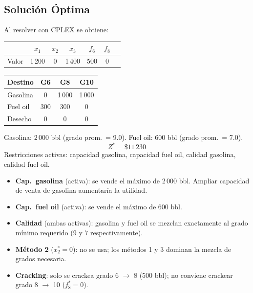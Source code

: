 \documentclass[12pt,a4paper]{article}
\begin{document}
\subsection{Solución Óptima}

Al resolver con CPLEX se obtiene:

\begin{center}
\renewcommand{\arraystretch}{1.3}
\begin{tabular}{@{}lcccccc@{}}
\toprule
& $x_1$ & $x_2$ & $x_3$ & $f_6$ & $f_8$ &\\
\midrule
Valor & 1\,200 & 0 & 1\,400 & 500 & 0 &\\
\bottomrule
\end{tabular}
\end{center}

\begin{center}
\renewcommand{\arraystretch}{1.3}
\begin{tabular}{@{}lccc@{}}
\toprule
\textbf{Destino} & \textbf{G6} & \textbf{G8} & \textbf{G10}\\
\midrule
Gasolina  & 0     & 1\,000 & 1\,000\\
Fuel oil  & 300   & 300    & 0\\
Desecho   & 0     & 0      & 0\\
\bottomrule
\end{tabular}
\end{center}

\begin{solucbox}
Gasolina: 2\,000 bbl (grado prom.\ = 9.0). Fuel oil: 600 bbl (grado prom.\ = 7.0).
\[
  \boxed{Z^* = \$11\,230}
\]
Restricciones activas: capacidad gasolina, capacidad fuel oil, calidad gasolina, calidad fuel oil.
\end{solucbox}

\begin{sensbox}
\begin{itemize}[leftmargin=1.5em]
  \item \textbf{Cap.\ gasolina} (activa): se vende el máximo de 2\,000 bbl.
    Ampliar capacidad de venta de gasolina aumentaría la utilidad.
  \item \textbf{Cap.\ fuel oil} (activa): se vende el máximo de 600 bbl.
  \item \textbf{Calidad} (ambas activas): gasolina y fuel oil se mezclan exactamente
    al grado mínimo requerido (9 y 7 respectivamente).
  \item \textbf{Método 2} ($x_2^*=0$): no se usa; los métodos 1 y 3 dominan
    la mezcla de grados necesaria.
  \item \textbf{Cracking}: solo se crackea grado 6 $\to$ 8 (500 bbl);
    no conviene crackear grado 8 $\to$ 10 ($f_8^*=0$).
\end{itemize}
\end{sensbox}
\end{document}
